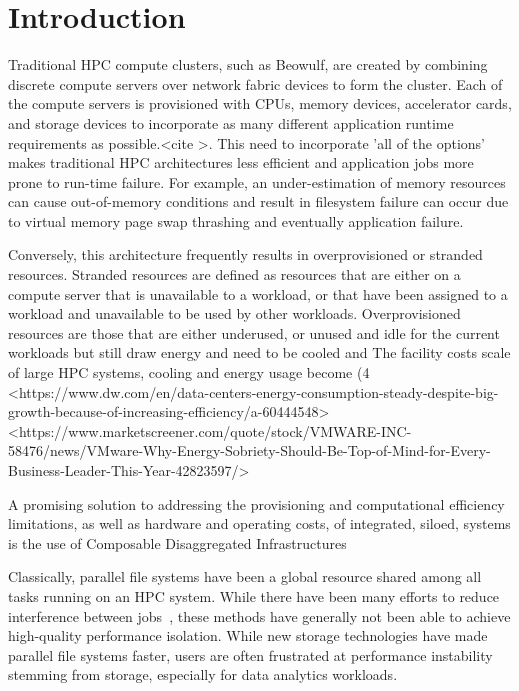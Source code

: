 \section{Introduction}

Traditional HPC compute clusters, such as Beowulf, are created by combining discrete compute servers over network fabric devices to form the cluster.  Each of the compute servers is provisioned with CPUs, memory devices, accelerator cards, and storage devices to incorporate as many different application runtime requirements as possible.<cite >. This need to incorporate 'all of the options' makes traditional HPC architectures less efficient and application jobs more prone to run-time failure.    
For example, an under-estimation of memory resources can cause out-of-memory conditions and result in filesystem failure can occur due to virtual memory page swap thrashing and eventually application failure.

Conversely, this architecture frequently results in overprovisioned or stranded resources.  Stranded resources are defined as resources that are either on a compute server that is unavailable to a workload, or that have been assigned to a workload and unavailable to be used by other workloads. Overprovisioned resources are those that are either underused, or unused and idle for the current workloads but still draw energy and need to be cooled and The facility costs scale of large HPC systems, cooling and energy usage become  
  (4%
  <https://www.dw.com/en/data-centers-energy-consumption-steady-despite-big-growth-because-of-increasing-efficiency/a-60444548>
  <https://www.marketscreener.com/quote/stock/VMWARE-INC-58476/news/VMware-Why-Energy-Sobriety-Should-Be-Top-of-Mind-for-Every-Business-Leader-This-Year-42823597/>
  
A promising solution to addressing the provisioning and computational efficiency limitations, as well as hardware and operating costs, of integrated, siloed, systems is the use of Composable Disaggregated Infrastructures 

  
  
Classically, parallel file systems have been a global resource shared among all tasks running on an HPC system. While there have been many efforts to reduce interference between jobs~\cite{10.1145/2063384.2063407,7573843}, these methods have generally not been able to achieve high-quality performance isolation. While new storage technologies have made parallel file systems faster, users are often frustrated at performance instability stemming from storage, especially for data analytics workloads.

